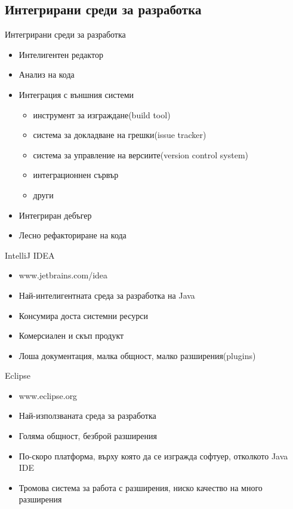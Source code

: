 \documentclass{beamer}
\begin{document}
\subsection{Интегрирани среди за разработка}
\begin{frame}{Интегрирани среди за разработка}
  \transdissolve  
  \begin{itemize}
    \item Интелигентен редактор
    \item Анализ на кода
    \item Интеграция с външния системи
      \begin{itemize}
        \item инструмент за изграждане(build tool)
        \item система за докладване на грешки(issue tracker)
        \item система за управление на версиите(version control
          system)
        \item интеграционнен сървър
        \item други
      \end{itemize}
    \item Интегриран дебъгер
    \item Лесно рефакториране на кода
  \end{itemize}
\end{frame}

\begin{frame}{IntelliJ IDEA}
  \transdissolve
  \begin{itemize}
    \item www.jetbrains.com/idea
    \item Най-интелигентната среда за
    разработка на Java
    \item Консумира доста системни ресурси
    \item Комерсиален и скъп продукт
    \item Лоша документация, малка общност,
    малко разширения(plugins)
  \end{itemize}
\end{frame}

\begin{frame}{Eclipse}
  \transdissolve
  \begin{itemize}
    \item www.eclipse.org
    \item Най-използваната среда за разработка
    \item Голяма общност, безброй разширения
    \item По-скоро платформа, върху която да се
    изгражда софтуер, отколкото Java IDE
    \item Тромова система за работа с
    разширения, ниско качество на много
    разширения
  \end{itemize}
\end{frame}
\end{document}
